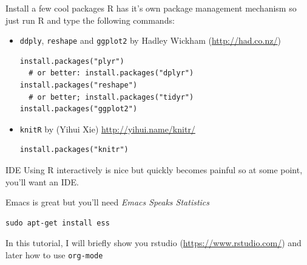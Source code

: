 \documentclass[xcolor=x11names,compress,8pt]{beamer}
\renewcommand{\(}{\begin{columns}}
\renewcommand{\)}{\end{columns}}
\newcommand{\<}[1]{\begin{column}{#1}}
\renewcommand{\>}{\end{column}}
\begin{document}
\begin{frame}[fragile,label=sec-4-1-5]{Install a few cool packages}
 R has it's own package management mechanism so just run R and type the
following commands:
\begin{itemize}
\item \texttt{ddply}, \texttt{reshape} and \texttt{ggplot2} by Hadley Wickham (\url{http://had.co.nz/})
\begin{verbatim}
install.packages("plyr")    
  # or better: install.packages("dplyr")
install.packages("reshape") 
  # or better; install.packages("tidyr")
install.packages("ggplot2")
\end{verbatim}
\item \texttt{knitR} by (Yihui Xie) \url{http://yihui.name/knitr/}
\begin{verbatim}
install.packages("knitr")
\end{verbatim}
\end{itemize}
\end{frame}
\begin{frame}[fragile,label=sec-4-1-6]{IDE}
 Using R interactively is nice but quickly becomes painful so at some
point, you'll want an IDE.

\medskip

Emacs is great but you'll need \emph{Emacs Speaks Statistics}
\begin{verbatim}
sudo apt-get install ess
\end{verbatim}
\medskip

\begin{center}
In this tutorial, I will briefly show you \alert{rstudio}
(\url{https://www.rstudio.com/}) and later how to use \texttt{org-mode}
\end{center}
\end{frame}
\end{document}
